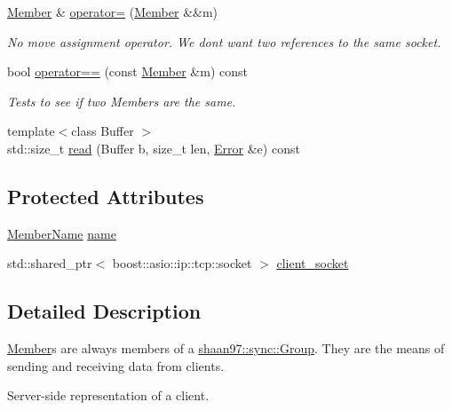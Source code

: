 \begin{DoxyCompactItemize}
\hyperlink{classshaan97_1_1sync_1_1_member}{Member} \& \hyperlink{classshaan97_1_1sync_1_1_member_a50f34f14f5325ec2dc9d05ddfca3ee3f}{operator=} (\hyperlink{classshaan97_1_1sync_1_1_member}{Member} \&\&m)
\begin{DoxyCompactList}\small\item\em No move assignment operator. We don\textquotesingle{}t want two references to the same socket. \end{DoxyCompactList}\item 
bool \hyperlink{classshaan97_1_1sync_1_1_member_ae7e47ef4b175dfc44e396ae7ede465e0}{operator==} (const \hyperlink{classshaan97_1_1sync_1_1_member}{Member} \&m) const
\begin{DoxyCompactList}\small\item\em Tests to see if two Members are the same. \end{DoxyCompactList}\item 
{\footnotesize template$<$class Buffer $>$ }\\std\+::size\+\_\+t \hyperlink{classshaan97_1_1sync_1_1_member_a58a9c4dad0338a4101ed36ee710ed8f2}{read} (Buffer b, size\+\_\+t len, \hyperlink{classshaan97_1_1sync_1_1_error}{Error} \&e) const
\end{DoxyCompactItemize}
\subsection*{Protected Attributes}
\begin{DoxyCompactItemize}
\item 
\hyperlink{namespaceshaan97_1_1sync_af59c2c9185f7cde547b79fbe0bf8ec71}{Member\+Name} \hyperlink{classshaan97_1_1sync_1_1_member_a42e3bc15f330702c4deac3dab4220c9b}{name}
\item 
std\+::shared\+\_\+ptr$<$ boost\+::asio\+::ip\+::tcp\+::socket $>$ \hyperlink{classshaan97_1_1sync_1_1_member_a1ff8d00f3f0f0bebc79aec31429719c7}{client\+\_\+socket}
\end{DoxyCompactItemize}


\subsection{Detailed Description}
{\ttfamily \hyperlink{classshaan97_1_1sync_1_1_member}{Member}}s are always members of a {\ttfamily \hyperlink{classshaan97_1_1sync_1_1_group}{shaan97\+::sync\+::\+Group}}. They are the means of sending and receiving data from clients. 

Server-\/side representation of a client. 

